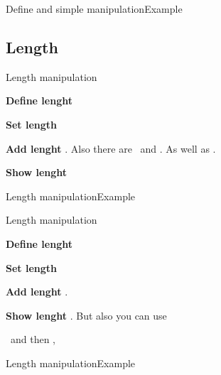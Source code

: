\begin{frame}{Define and simple manipulation\tW\magicPage}{Example}\relax


\end{frame}

\subsection{Length}


\begin{frame}{Length manipulation\tW\magicPage}\relax

\textbf{Define lenght} 

\textbf{Set length} 

\textbf{Add lenght}  . Also there are \ccol\multiply\ and \ccol\divide. As well as \ccol\dimexp.

\textbf{Show lenght} 


\end{frame}

\begin{frame}{Length manipulation\tW\magicPage}{Example}\relax


\end{frame}


\begin{frame}{Length manipulation\lW\magicPage}\relax

\textbf{Define lenght} 

\textbf{Set length} \ccol{\setlength}

\textbf{Add lenght}  \ccol{\addtolength}. 

\textbf{Show lenght} . But also you can use \ncol\usepackage{printlen}\ and then \ccol\uselengthunit, \ccol\printlength



\end{frame}

\begin{frame}{Length manipulation\lW\magicPage}{Example}\relax


\end{frame}

